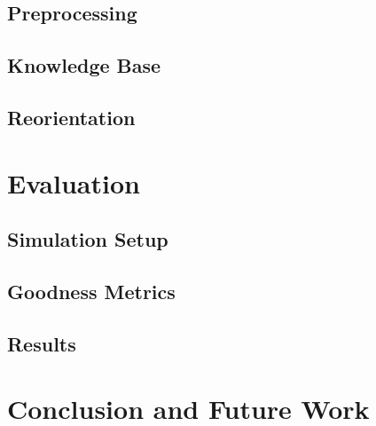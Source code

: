 \documentclass{iitkthesis}
\begin{document}
 \section{Preprocessing}
 \section{Knowledge Base}
 \section{Reorientation}
 \label{kbase}
 \chapter{Evaluation}
 \label{evaluation}

 \section{Simulation Setup}
 \section{Goodness Metrics}
 \section{Results}
 \chapter{Conclusion and Future Work}


\end{document}
